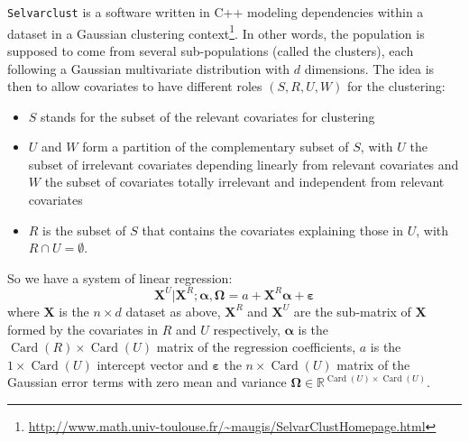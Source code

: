 \documentclass[12pt,a4paper]{report}
\begin{document}
			{\tt Selvarclust} is a software written in C++ modeling dependencies within a dataset			 \cite{maugis2009variable} in a Gaussian clustering context\footnote{\url{http://www.math.univ-toulouse.fr/~maugis/SelvarClustHomepage.html}}. In other words, the population is supposed to come from several sub-populations (called the clusters), each following a Gaussian multivariate distribution with $d$ dimensions.
			The idea is then to allow covariates to have different roles $(S,R,U,W)$ for the clustering:
			\begin{itemize}
				\item $S$ stands for the subset of the relevant covariates for clustering
				\item $U$ and $W$ form a partition of the complementary subset of $S$, with $U$ the subset of irrelevant covariates depending linearly from relevant covariates and $W$ the subset of covariates totally irrelevant and independent from relevant covariates
				\item $R$ is the subset of $S$ that contains the covariates explaining those in $U$, with $R\cap U=\emptyset$.
\end{itemize}			 
So we have a system of linear regression:
\begin{equation}
	\boldsymbol{X}^{U}|\boldsymbol{X}^{R};\boldsymbol{\alpha},\boldsymbol{\Omega}=a+\boldsymbol{X}^R \boldsymbol{\alpha}+ \boldsymbol{\varepsilon}  \nonumber 
\end{equation}
where $\boldsymbol{X}$ is the $n\times d$ dataset as above, $\boldsymbol{X}^R$ and $\boldsymbol{X}^U$ are the sub-matrix of  $\boldsymbol{X}$ formed by the covariates in $R$ and $U$ respectively, $\boldsymbol{\alpha}$ is the $\operatorname{Card}(R)\times \operatorname{Card}(U)$ matrix of the regression coefficients, $a$ is the $1\times \operatorname{Card}(U)$ intercept vector and $\boldsymbol{\varepsilon}$ the $n\times \operatorname{Card}(U) $ matrix of the Gaussian error terms with zero mean and variance $\boldsymbol{\Omega}\in \mathbb{R}^{\operatorname{Card}(U)\times \operatorname{Card}(U)}$.\\
\end{document}
